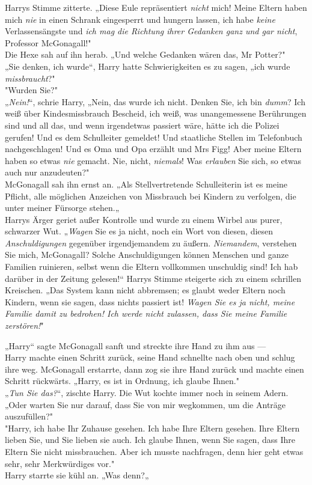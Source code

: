 {Harrys Stimme zitterte. „Diese Eule repräsentiert \emph{nicht} mich! Meine Eltern haben mich \emph{nie} in einen Schrank eingesperrt und hungern lassen, ich habe \emph{keine} Verlassensängste und \emph{ich mag die Richtung ihrer Gedanken ganz und gar nicht}, Professor McGonagall!"\\ Die Hexe sah auf ihn herab. „Und welche Gedanken wären das, Mr Potter?"\\ „Sie denken, ich wurde“, Harry hatte Schwierigkeiten es zu sagen, „ich wurde \emph{missbraucht}?"\\ "Wurden Sie?"\\ „\emph{Nein!}“, schrie Harry, „Nein, das wurde ich nicht. Denken Sie, ich bin \emph{dumm}? Ich weiß über Kindesmissbrauch Bescheid, ich weiß, was unangemessene Berührungen sind und all das, und wenn irgendetwas passiert wäre, hätte ich die Polizei gerufen! Und es dem Schulleiter gemeldet! Und staatliche Stellen im Telefonbuch nachgeschlagen! Und es Oma und Opa erzählt und Mrs Figg! Aber meine Eltern haben so etwas \emph{nie} gemacht. Nie, nicht, \emph{niemals}! Was \emph{erlauben} Sie sich, so etwas auch nur anzudeuten?"\\ McGonagall sah ihn ernst an. „Als Stellvertretende Schulleiterin ist es meine Pflicht, alle möglichen Anzeichen von Missbrauch bei Kindern zu verfolgen, die unter meiner Fürsorge stehen.„\\ Harrys Ärger geriet außer Kontrolle und wurde zu einem Wirbel aus purer, schwarzer Wut. „\emph{Wagen} Sie es ja nicht, noch ein Wort von diesen, diesen \emph{Anschuldigungen} gegenüber irgendjemandem zu äußern. \emph{Niemandem}, verstehen Sie mich, McGonagall? Solche Anschuldigungen können Menschen und ganze Familien ruinieren, selbst wenn die Eltern vollkommen unschuldig sind! Ich hab darüber in der Zeitung gelesen!“ Harrys Stimme steigerte sich zu einem schrillen Kreischen. „Das System kann nicht abbremsen; es glaubt weder Eltern noch Kindern, wenn sie sagen, dass nichts passiert ist! \emph{Wagen Sie es ja nicht, meine Familie damit zu bedrohen! Ich werde nicht zulassen, dass Sie meine Familie zerstören!}"

„Harry“ sagte McGonagall sanft und streckte ihre Hand zu ihm aus ---\\ Harry machte einen Schritt zurück, seine Hand schnellte nach oben und schlug ihre weg. McGonagall erstarrte, dann zog sie ihre Hand zurück und machte einen Schritt rückwärts. „Harry, es ist in Ordnung, ich glaube Ihnen."\\ „\emph{Tun Sie das?}“, zischte Harry. Die Wut kochte immer noch in seinem Adern. „Oder warten Sie nur darauf, dass Sie von mir wegkommen, um die Anträge auszufüllen?"\\ "Harry, ich habe Ihr Zuhause gesehen. Ich habe Ihre Eltern gesehen. Ihre Eltern lieben Sie, und Sie lieben sie auch. Ich glaube Ihnen, wenn Sie sagen, dass Ihre Eltern Sie nicht missbrauchen. Aber ich musste nachfragen, denn hier geht etwas sehr, sehr Merkwürdiges vor."\\ Harry starrte sie kühl an. „Was denn?„

}
